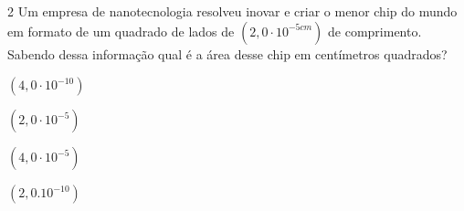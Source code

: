 



\num{2} Um empresa de nanotecnologia resolveu inovar e criar o menor chip do
mundo em formato de um quadrado de lados de $(2,0 \cdot 10 ^{-5 cm})$ de
comprimento. Sabendo dessa informação qual é a área desse chip em centímetros quadrados?

\begin{escolha}
\item $(4,0 \cdot 10^{-10})$
\item $(2,0 \cdot 10^{-5})$
\item $(4,0 \cdot 10^{-5})$
\item $(2,0.10^{-10})$
\end{escolha}












